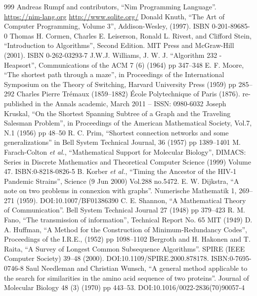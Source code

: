 \documentclass[justified, sixbynine]{tufte-book}
\theoremstyle{plain}%
\newtheorem * {corollary}{Corollary}
\theoremstyle{definition}
\theoremstyle{remark}
\newtheorem * {remark}{Remark}
\newtheorem * {note}{Note}
\begin{document}
\begin{thebibliography}{999}
 Andreas Rumpf and contributors, ``Nim Programming Language''. \url{https://nim-lang.org}
 \url{http://www.sqlite.org/}
 Donald Knuth, ``The Art of Computer Programming, Volume 3'', Addison-Wesley, (1997). ISBN 0-201-89685-0
 Thomas H. Cormen, Charles E. Leiserson, Ronald L. Rivest, and Clifford Stein, ``Introduction to Algorithms'', Second Edition. MIT Press and McGraw-Hill (2001). ISBN 0-262-03293-7
 J.W.J. Williams, J. W. J. ``Algorithm 232 - Heapsort'', Communications of the ACM 7 (6) (1964) pp 347–348
 E. F. Moore, ``The shortest path through a maze'', in Proceedings of the International Symposium on the Theory of Switching, Harvard University Press (1959) pp 285–292
 Charles Pierre Trémaux (1859–1882) École Polytechnique of Paris (1876). re-published in the Annals academic, March 2011 – ISSN: 0980-6032
 Joseph Kruskal, ``On the Shortest Spanning Subtree of a Graph and the Traveling Salesman Problem'', in Proceedings of the American Mathematical Society, Vol.7, N.1 (1956) pp 48–50
 R. C. Prim, ``Shortest connection networks and some generalizations'' in Bell System Technical Journal, 36 (1957) pp 1389–1401
 M. Farach-Colton {\it et al.}, ``Mathematical Support for Molecular Biology'', DIMACS: Series in Discrete Mathematics and Theoretical Computer Science (1999) Volume 47. ISBN:0-8218-0826-5
 B. Korber {\it et al.}, ``Timing the Ancestor of the HIV-1 Pandemic Strains'', Science (9 Jun 2000) Vol.288 no.5472.
 E. W. Dijkstra, ``A note on two problems in connexion with graphs''. Numerische Mathematik 1, 269–271 (1959). DOI:10.1007/BF01386390
 C. E. Shannon, ``A Mathematical Theory of Communication''. Bell System Technical Journal 27 (1948) pp 379–423
 R. M. Fano, ``The transmission of information'', Technical Report No. 65 MIT (1949)
 D. A. Huffman, ``A Method for the Construction of Minimum-Redundancy Codes'', Proceedings of the I.R.E., (1952) pp 1098–1102
 Bergroth and H. Hakonen and T. Raita, ``A Survey of Longest Common Subsequence Algorithms''. SPIRE (IEEE Computer Society) 39–48 (2000). DOI:10.1109/SPIRE.2000.878178. ISBN:0-7695-0746-8
 Saul Needleman and Christian Wunsch, ``A general method applicable to the search for similarities in the amino acid sequence of two proteins''. Journal of Molecular Biology 48 (3) (1970) pp 443–53. DOI:10.1016/0022-2836(70)90057-4

\end{thebibliography}
\end{document}
